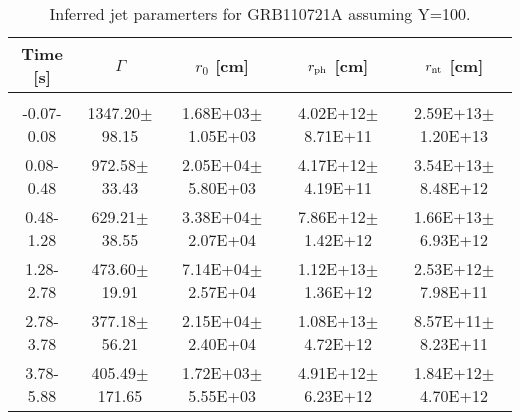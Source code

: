 \begin{table}[htp]
\scriptsize
\label{tab:}
\begin{tabular}{c c c c c}
Time [s] & $\Gamma$ & $r_0$ [cm] & $r_{\rm ph}$ [cm] & $r_{\rm nt}$ [cm] \\
\hline \hline\\ 

-0.07-0.08 & 1347.20$\pm$98.15 & 1.68E+03$\pm$1.05E+03 & 4.02E+12$\pm$8.71E+11 & 2.59E+13$\pm$1.20E+13 \\ 

0.08-0.48 & 972.58$\pm$33.43 & 2.05E+04$\pm$5.80E+03 & 4.17E+12$\pm$4.19E+11 & 3.54E+13$\pm$8.48E+12 \\ 

0.48-1.28 & 629.21$\pm$38.55 & 3.38E+04$\pm$2.07E+04 & 7.86E+12$\pm$1.42E+12 & 1.66E+13$\pm$6.93E+12 \\ 

1.28-2.78 & 473.60$\pm$19.91 & 7.14E+04$\pm$2.57E+04 & 1.12E+13$\pm$1.36E+12 & 2.53E+12$\pm$7.98E+11 \\ 

2.78-3.78 & 377.18$\pm$56.21 & 2.15E+04$\pm$2.40E+04 & 1.08E+13$\pm$4.72E+12 & 8.57E+11$\pm$8.23E+11 \\ 

3.78-5.88 & 405.49$\pm$171.65 & 1.72E+03$\pm$5.55E+03 & 4.91E+12$\pm$6.23E+12 & 1.84E+12$\pm$4.70E+12 \\ 

\end{tabular}
\caption{Inferred jet paramerters for GRB110721A assuming Y=100.}
\end{table}
